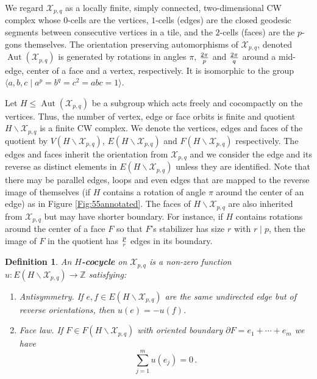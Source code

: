 \documentclass[11pt]{article}
\newtheorem{definition}[theorem]{Definition}
\theoremstyle{remark}
\newcommand{\cX}{\mathcal X}
\newcommand{\Z}{\mathbb Z}
\newcommand{\Aut}{\operatorname{Aut}}
\newcommand{\ve}{\vec e}
\begin{document}
We regard $\cX_{p,q}$ as a locally finite, simply connected, two-dimensional CW complex whose $0$-cells are the vertices, $1$-cells (edges) are the closed geodesic segments between consecutive vertices in a tile, and the $2$-cells (faces) are the $p$-gons themselves. %
The orientation preserving automorphisms of $\cX_{p,q}$, denoted $\Aut(\cX_{p,q})$ is generated by rotations in angles $\pi$, ${2\pi \over p}$ and ${2\pi \over q}$ around a mid-edge, center of a face and a vertex, respectively. It is isomorphic to the group $\langle a,b,c \mid a^p=b^q=c^2=abc=1 \rangle$.


Let $H\leq\Aut(\mathcal X_{p,q})$ be a subgroup which acts freely and cocompactly on the vertices. Thus, the number of vertex, edge or face orbits is finite and quotient $H \backslash \cX_{p,q}$ is a finite CW complex. We denote the vertices, edges and faces of the quotient by $V(H\backslash \cX_{p,q})$, $E(H \backslash \cX_{p,q})$ and $F(H \backslash \cX_{p,q})$ respectively. The edges and faces inherit the orientation from $\cX_{p,q}$ and we consider the edge and its reverse as distinct elements in $E(H \backslash \cX_{p,q})$ unless they are identified. Note that there may be parallel edges, loops and even edges that are mapped to the reverse image of themselves (if $H$ contains a rotation of angle $\pi$ around the center of an edge) as in Figure \ref{Fig:55annotated}. The faces of $H \backslash \cX_{p,q}$ are also inherited from $\cX_{p,q}$ but may have shorter boundary. For instance, if $H$ contains rotations around the center of a face $F$ so that $F$'s stabilizer has size $r$ with $r \mid p$, then the image of $F$ in the quotient has ${p \over r}$ edges in its boundary. 

\begin{definition}\label{def:cocycle}
An {\bf $H$-cocycle} on $\cX_{p,q}$ is a non-zero function
$u: E(H\backslash \cX_{p,q}) \to \Z$
satisfying:%
\begin{enumerate}[label=(\roman*)]
\item \emph{Antisymmetry}. If $e,f\in E(H \backslash \cX_{p,q})$ are the same undirected edge but of reverse orientations, then $u(e)=-u(f)$.
\item \emph{Face law.} If $F \in F(H \backslash \cX_{p,q})$ with oriented boundary $\partial F = e_1+\cdots+e_m$
we have
\[
\sum_{j=1}^m u(e_j)=0 \, .
\]
\end{enumerate}
\end{definition}
\end{document}
